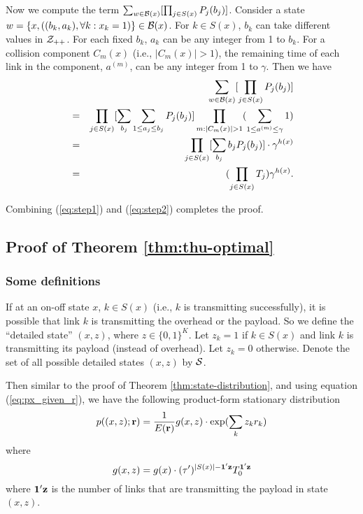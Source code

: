 \documentclass{IEEEtran}
\begin{document}
Now we compute the term $\sum_{w\in{\cal B}(x)}[\prod_{j\in S(x)}P_{j}(b_{j})]$.
Consider a state $w=\{x,((b_{k},a_{k}),\forall k:x_{k}=1)\}\in{\cal B}(x)$.
For $k\in S(x)$, $b_{k}$ can take different values in ${\cal Z}_{++}$.
For each fixed $b_{k}$, $a_{k}$ can be any integer from 1 to $b_{k}$.
For a collision component $C_{m}(x)$ (i.e., $|C_{m}(x)|>1$), the
remaining time of each link in the component, $a^{(m)}$, can be any
integer from 1 to $\gamma$. Then we have \begin{eqnarray}
 &  & \sum_{w\in{\cal B}(x)}[\prod_{j\in S(x)}P_{j}(b_{j})]\nonumber \\
 & = & \prod_{j\in S(x)}[\sum_{b_{j}}\sum_{1\le a_{j}\le b_{j}}P_{j}(b_{j})]\prod_{m:|C_{m}(x)|>1}(\sum_{1\le a^{(m)}\le\gamma}1)\nonumber \\
 & = & \prod_{j\in S(x)}[\sum_{b_{j}}b_{j}P_{j}(b_{j})]\cdot\gamma^{h(x)}\nonumber \\
 & = & (\prod_{j\in S(x)}T_{j})\gamma^{h(x)}.\label{eq:step2}\end{eqnarray}


Combining (\ref{eq:step1}) and (\ref{eq:step2}) completes the proof.


\subsection{\label{sub:Proof-of-rstar}Proof of Theorem \ref{thm:thu-optimal}}


\subsubsection{Some definitions}

If at an on-off state $x$, $k\in S(x)$ (i.e., $k$ is transmitting
successfully), it is possible that link $k$ is transmitting the overhead
or the payload. So we define the {}``detailed state'' $(x,z)$,
where $z\in\{0,1\}^{K}$. Let $z_{k}=1$ if $k\in S(x)$ and link
$k$ is transmitting its payload (instead of overhead). Let $z_{k}=0$
otherwise. Denote the set of all possible detailed states $(x,z)$
by ${\cal S}$. 

Then similar to the proof of Theorem \ref{thm:state-distribution},
and using equation (\ref{eq:px_given_r}), we have the following product-form
stationary distribution\begin{equation}
p((x,z);{\bf r})=\frac{1}{E({\bf r})}g(x,z)\cdot\exp(\sum_{k}z_{k}r_{k})\label{eq:detailed-state-dist}\end{equation}
where \begin{equation}
g(x,z)=g(x)\cdot(\tau')^{|S(x)|-{\bf 1}'{\bf z}}T_{0}^{{\bf 1}'{\bf z}}\label{eq:g_x_z}\end{equation}
where ${\bf 1}'{\bf z}$ is the number of links that are transmitting
the payload in state $(x,z)$.
\end{document}

